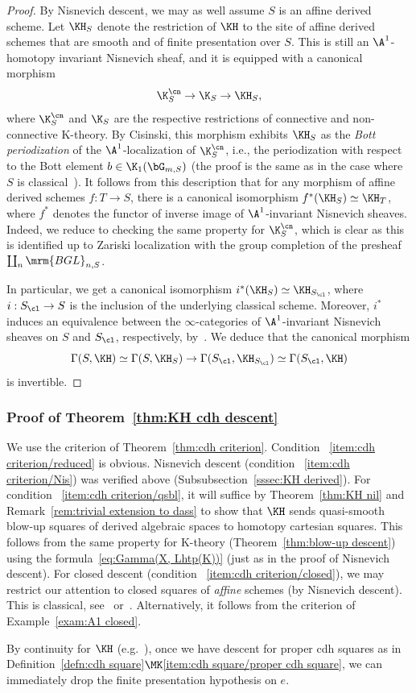 \begin{proof}
By Nisnevich descent, we may as well assume $S$ is an affine derived scheme. Let $\KH_S$ denote the restriction of $\KH$ to the site of affine derived schemes that are smooth and of finite presentation over $S$. This is still an $\A^1$-homotopy invariant Nisnevich sheaf, and it is equipped with a canonical morphism
\[
\K^{\cn}_S \to \K_S \to \KH_S,
\]
where $\K^{\cn}_S$ and $\K_S$ are the respective restrictions of connective and non-connective K-theory. By Cisinski, this morphism exhibits $\KH_S$ as the \emph{Bott periodization} of the $\A^1$-localization of $\K^{\cn}_S$, i.e., the periodization with respect to the Bott element $b \in \K_1(\bG_{m,S})$ (the proof is the same as in the case where $S$ is classical~\cite[Corollary~2.12]{CisinskiKH}). It follows from this description that for any morphism of affine derived schemes $f : T \to S$, there is a canonical isomorphism $f^*(\KH_S) \simeq \KH_T$, where $f^*$ denotes the functor of inverse image of $\A^1$-invariant Nisnevich sheaves. Indeed, we reduce to checking the same property for $\K^{\cn}_S$, which is clear as this is identified up to Zariski localization with the group completion of the presheaf $\coprod_n \mrm{BGL}_{n,S}$.

In particular, we get a canonical isomorphism $i^*(\KH_S) \simeq \KH_{S_\cl}$, where $i : S_\cl \to S$ is the inclusion of the underlying classical scheme. Moreover, $i^*$ induces an equivalence between the $\infty$-categories of $\A^1$-invariant Nisnevich sheaves on $S$ and $S_\cl$, respectively, by~\cite[Corollary~1.3.5]{KhanThesis}. We deduce that the canonical morphism
\[
\Gamma(S, \KH)
\simeq \Gamma(S, \KH_S)
\to \Gamma(S_\cl, \KH_{S_\cl})
\simeq \Gamma(S_\cl, \KH)
\]
is invertible.
\end{proof}

\subsubsection{Proof of Theorem~\ref{thm:KH cdh descent}}\label{sssec:proof of KH cdh descent}

We use the criterion of Theorem~\ref{thm:cdh criterion}. Condition~
\eqref{item:cdh criterion/reduced} is obvious. Nisnevich descent (condition~
\eqref{item:cdh criterion/Nis}) was verified above (Subsubsection~\ref{sssec:KH derived}). For condition~
\eqref{item:cdh criterion/qsbl}, it will suffice by Theorem~\ref{thm:KH nil} and Remark~\ref{rem:trivial extension to dass} to show that $\KH$ sends quasi-smooth blow-up squares of derived algebraic spaces to homotopy cartesian squares. This follows from the same property for K-theory (Theorem~\ref{thm:blow-up descent}) using the formula~\eqref{eq:Gamma(X, Lhtp(K))} (just as in the proof of Nisnevich descent). For closed descent (condition~
\eqref{item:cdh criterion/closed}), we may restrict our attention to closed squares of \emph{affine} schemes (by Nisnevich descent). This is classical, see~\cite[Exer.~9.11$\MK$(f)]{ThomasonTrobaugh} or~\cite[Corollary~4.10]{WeibelKH}. Alternatively, it follows from the criterion of Example~\ref{exam:A1 closed}.

\begin{rema}
By continuity for $\KH$ (e.g.~\cite[Theorem.~4.9$\MK$(5)]{HoyoisKrishna}), once we have descent for proper cdh squares as in Definition~\ref{defn:cdh square}$\MK$\eqref{item:cdh square/proper cdh square}, we can immediately drop the finite presentation hypothesis on $e$.
\end{rema}


